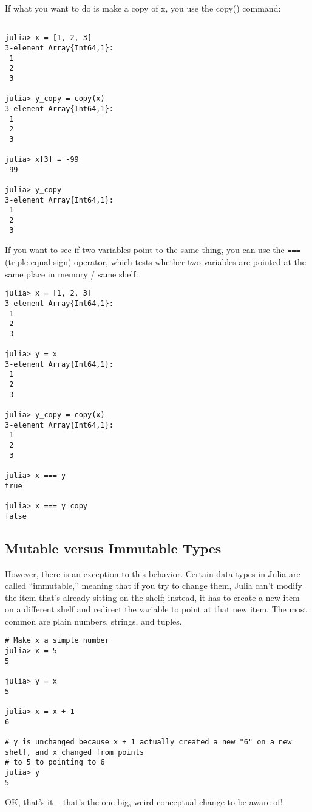 \documentclass[12pt]{article}
\begin{document}
If what you want to do is make a copy of x, you use the copy() command:

\begin{verbatim}

julia> x = [1, 2, 3]
3-element Array{Int64,1}:
 1
 2
 3

julia> y_copy = copy(x)
3-element Array{Int64,1}:
 1
 2
 3

julia> x[3] = -99
-99

julia> y_copy
3-element Array{Int64,1}:
 1
 2
 3
\end{verbatim}


If you want to see if two variables point to the same thing, you can use the \texttt{===} (triple equal sign) operator, which tests whether two variables are pointed at the same place in memory / same shelf:

\begin{verbatim}
julia> x = [1, 2, 3]
3-element Array{Int64,1}:
 1
 2
 3

julia> y = x
3-element Array{Int64,1}:
 1
 2
 3

julia> y_copy = copy(x)
3-element Array{Int64,1}:
 1
 2
 3

julia> x === y
true

julia> x === y_copy
false
\end{verbatim}

\subsection{Mutable versus Immutable Types}

However, there is an exception to this behavior. Certain data types in Julia are called ``immutable,'' meaning that if you try to change them, Julia can’t modify the item that’s already sitting on the shelf; instead, it has to create a new item on a different shelf and redirect the variable to point at that new item. The most common are plain numbers, strings, and tuples.

\begin{verbatim}
# Make x a simple number
julia> x = 5
5

julia> y = x
5

julia> x = x + 1
6

# y is unchanged because x + 1 actually created a new "6" on a new shelf, and x changed from points
# to 5 to pointing to 6
julia> y
5
\end{verbatim}

OK, that’s it – that’s the one big, weird conceptual change to be aware of!
\end{document}
